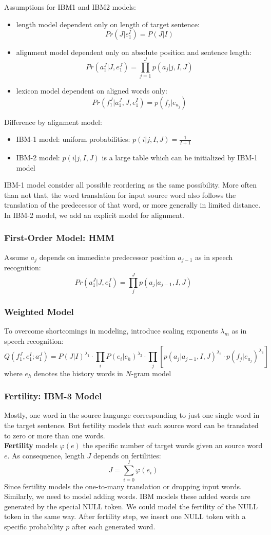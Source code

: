 \noindent Assumptions for IBM1 and IBM2 models:
\begin{itemize}
	\item length model
	dependent only on length of target sentence: \[Pr(J|e_1^I) = P(J|I)\]
	\item alignment model 
	dependent only on absolute position and sentence length:
	\[Pr(a_1^J | J, e_1^J) = \prod_{j=1}^J p(a_j|j, I, J)  \]
	\item lexicon model
	dependent on aligned words only:
	\[Pr(f_1^J | a_1^J, J, e_1^I) = p(f_j | e_{a_j})\] 
\end{itemize}
Difference by alignment model:
\begin{itemize}
	\item IBM-1 model: uniform probabilities: ${p(i|j, I,J) = \frac{1}{I+1}}$
	\item IBM-2 model: ${p(i|j,I,J)}$ is a large table which can be initialized by IBM-1 model
\end{itemize}


 IBM-1 model consider all possible reordering as the same possibility.  More often than not that, the word translation for input source word also follows the translation of the predecessor of that word, or more generally in limited distance.  In IBM-2 model, we add an explicit model for alignment.


\subsubsection{First-Order Model: HMM}
Assume $a_j$ depends on immediate predecessor position ${a_{j-1}}$ as in speech recognition:
\[Pr(a_1^J | J, e_1^J) = \prod_{j}^J p(a_j|a_{j-1}, I, J)  \]
\subsubsection{Weighted Model}
To overcome shortcomings in modeling, introduce scaling exponents ${\lambda_{m}}$ as in speech recognition:
\[ Q(f_1^J, e_1^I; a_1^J) = P(J|I)^{\lambda_1} \cdot \prod_{i} P(e_i|e_h)^{\lambda_2} \cdot \prod_{j} [p(a_j|a_{j-1}, I, J)^{\lambda_{3}} \cdot p(f_j|e_{a_j})^{\lambda_4}]  \]
where $e_h$ denotes the history words in $N$-gram model

\subsubsection{Fertility: IBM-3 Model}
 Mostly, one word in the source language corresponding to just one single word in the target sentence. But fertility models that each source word can be translated to zero or more than one words.\\
\textbf{Fertility}  models $\varphi(e)$ the specific number of target words given an source word $e$. As consequence, length $J$ depends on fertilities:
\[ J = \sum_{i=0}^I \varphi(e_i)\]
Since fertility models the one-to-many translation or dropping input words.  Similarly, we need to model adding words. IBM models these added words are generated by the special NULL token. We could model the fertility of the NULL token in the same way. After fertility step,  we insert one NULL token with a specific probability $p$ after each generated word. \\

